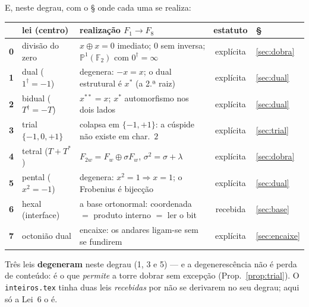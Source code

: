 \documentclass[11pt,a4paper]{article}
\newcommand{\code}[1]{\texttt{\small #1}}
\newcommand{\dg}{^{\dagger}}
\newcommand{\FF}{\mathbb{F}}
\begin{document}

\noindent E, neste degrau, com o § onde cada uma se realiza:

\begin{center}\small
\begin{tabular}{@{}clp{5.0cm}cl@{}}
\toprule
 & lei (centro) & realização $F_1\!\to\!F_8$ & estatuto & § \\
\midrule
\textbf{0} & divisão do zero & $x\oplus x=0$ imediato; $0$ sem inversa; $\mathbb{P}^1(\FF_2)$ com $0\dg=\infty$ & explícita & \ref{sec:dobra} \\
\textbf{1} & dual ($1\dg=-1$) & degenera: $-x=x$; o dual estrutural é $x^{*}$ (a 2.ª raiz) & explícita & \ref{sec:dual} \\
\textbf{2} & bidual ($T\dg=-T$) & $x^{**}=x$; $x^{*}$ automorfismo nos dois lados & explícita & \ref{sec:dual} \\
\textbf{3} & trial $\{-1,0,+1\}$ & colapsa em $\{-1,+1\}$: a cúspide não existe em char.~$2$ & explícita & \ref{sec:trial} \\
\textbf{4} & tetral ($T+T^{*}$) & $F_{2w}=F_w\oplus\sigma F_w$, $\sigma^2=\sigma+\lambda$ & explícita & \ref{sec:dobra} \\
\textbf{5} & pental ($x^{2}=-1$) & degenera: $x^2=1\Rightarrow x=1$; o Frobenius é bijecção & explícita & \ref{sec:dual} \\
\textbf{6} & hexal (interface) & a base ortonormal: coordenada $=$ produto interno $=$ ler o bit & recebida & \ref{sec:base} \\
\textbf{7} & octonião dual & encaixe: os andares ligam-se sem se fundirem & explícita & \ref{sec:encaixe} \\
\bottomrule
\end{tabular}
\end{center}

\noindent Três leis \textbf{degeneram} neste degrau (1, 3 e 5) --- e a degenerescência
não é perda de conteúdo: é o que \emph{permite} a torre dobrar sem excepção
(Prop.~\ref{prop:trial}). O \code{inteiros.tex} tinha duas leis
\emph{recebidas} por não se derivarem no seu degrau; aqui só a Lei~6 o é.
\end{document}
